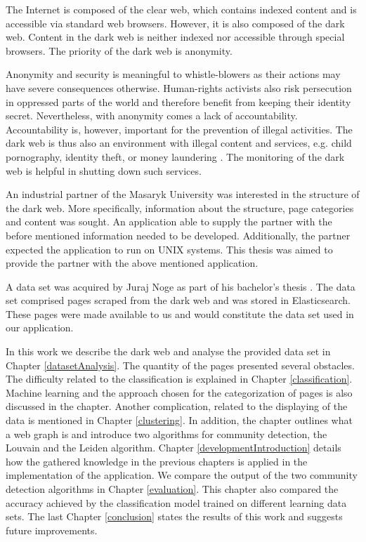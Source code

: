 \label{introduction}
The Internet is composed of the clear web, which contains indexed content and is accessible via standard web browsers. However, it is also composed of the dark web. Content in the dark web is neither indexed nor accessible through special browsers. The priority of the dark web is anonymity.

Anonymity and security is meaningful to whistle-blowers as their actions may have severe consequences otherwise. Human-rights activists also risk persecution in oppressed parts of the world and therefore benefit from keeping their identity secret. Nevertheless, with anonymity comes a lack of accountability. Accountability is, however, important for the prevention of illegal activities. The dark web is thus also an environment with illegal content and services, e.g. child pornography, identity theft, or money laundering \cite{theDarkNet}. The monitoring of the dark web is helpful in shutting down such services.

An industrial partner of the Masaryk University was interested in the structure of the dark web. More specifically, information about the structure, page categories and content was sought. An application able to supply the partner with the before mentioned information needed to be developed. Additionally, the partner expected the application to run on UNIX systems. This thesis was aimed to provide the partner with the above mentioned application. 

A data set was acquired by Juraj Noge as part of his bachelor's thesis \cite{bcScraping}. The data set comprised pages scraped from the dark web and was stored in Elasticsearch. These pages were made available to us and would constitute the data set used in our application.

In this work we describe the dark web and analyse the provided data set in Chapter \ref{datasetAnalysis}. The quantity of the pages presented several obstacles. The difficulty related to the classification is explained in Chapter \ref{classification}. Machine learning and the approach chosen for the categorization of pages is also discussed in the chapter. Another complication, related to the displaying of the data is mentioned in Chapter \ref{clustering}. In addition, the chapter outlines what a web graph is and introduce two algorithms for community detection, the Louvain and the Leiden algorithm. Chapter \ref{developmentIntroduction} details how the gathered knowledge in the previous chapters is applied in the implementation of the application. We compare the output of the two community detection algorithms in Chapter \ref{evaluation}. This chapter also compared the accuracy achieved by the classification model trained on different learning data sets. The last Chapter \ref{conclusion} states the results of this work and suggests future improvements.

